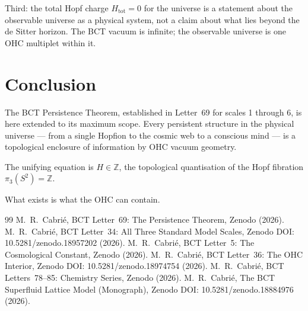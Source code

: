 \documentclass[aps,prl,twocolumn,superscriptaddress,floatfix]{revtex4-2}
\begin{document}
Third: the total Hopf charge $H_\mathrm{tot} = 0$ for the
universe is a statement about the observable universe as
a physical system, not a claim about what lies beyond the
de Sitter horizon. The BCT vacuum is infinite; the observable
universe is one OHC multiplet within it.

\section{Conclusion}

The BCT Persistence Theorem, established in Letter~69 for
scales 1 through 6, is here extended to its maximum scope.
Every persistent structure in the physical universe ---
from a single Hopfion to the cosmic web to a conscious mind
--- is a topological enclosure of information by OHC vacuum
geometry.

The unifying equation is $H \in \mathbb{Z}$, the topological
quantisation of the Hopf fibration $\pi_3(S^2) = \mathbb{Z}$.

What exists is what the OHC can contain.

\begin{thebibliography}{99}
 M.~R.~Cabri\'{e}, BCT Letter~69: The Persistence
Theorem, Zenodo (2026).
 M.~R.~Cabri\'{e}, BCT Letter~34: All Three
Standard Model Scales, Zenodo DOI: 10.5281/zenodo.18957202 (2026).
  M.~R.~Cabri\'{e}, BCT Letter~5: The Cosmological
Constant, Zenodo (2026).
 M.~R.~Cabri\'{e}, BCT Letter~36: The OHC
Interior, Zenodo DOI: 10.5281/zenodo.18974754 (2026).
 M.~R.~Cabri\'{e}, BCT Letters~78--85: Chemistry
Series, Zenodo (2026).
 M.~R.~Cabri\'{e}, The BCT Superfluid
Lattice Model (Monograph), Zenodo
DOI: 10.5281/zenodo.18884976 (2026).
\end{thebibliography}
\end{document}
